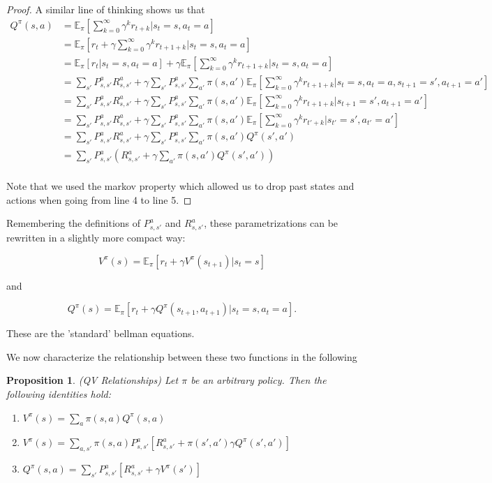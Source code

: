 \documentclass[11pt]{article} %
\newtheorem{prop}{Proposition}
\begin{document}
\begin{proof}
A similar line of thinking shows us that
	\[
		\begin{array}{rl}
			Q^{\pi}(s,a)	& = \mathbb{E}_{\pi}[\sum_{k=0}^{\infty} \gamma^k r_{t+k} | s_t = s, a_t = a]  \\
						& = \mathbb{E}_{\pi}[r_t + \gamma \sum_{k=0}^{\infty} \gamma^k r_{t+1+k} | s_t = s, a_t = a]  \\
						& = \mathbb{E}_{\pi}[r_t | s_t = s, a_t = a] + \gamma \mathbb{E}_{\pi}[ \sum_{k=0}^{\infty} \gamma^k r_{t+1+k} | s_t = s, a_t = a] \\
						& = \sum_{s'} P_{s,s'}^a R_{s,s'}^a + \gamma \sum_{s'} P_{s,s'}^a \sum_{a'} \pi(s,a') \mathbb{E}_{\pi}[\sum_{k=0}^{\infty} \gamma^k r_{t+1+k} | s_t = s, a_t = a, s_{t+1} = s', a_{t+1} = a'] \\
						& = \sum_{s'} P_{s,s'}^a R_{s,s'}^a + \gamma \sum_{s'} P_{s,s'}^a \sum_{a'} \pi(s,a') \mathbb{E}_{\pi}[\sum_{k=0}^{\infty} \gamma^k r_{t+1+k} | s_{t+1} = s', a_{t+1} = a'] \\
						& = \sum_{s'} P_{s,s'}^a R_{s,s'}^a + \gamma \sum_{s'} P_{s,s'}^a \sum_{a'} \pi(s,a') \mathbb{E}_{\pi}[\sum_{k=0}^{\infty} \gamma^k r_{t'+k} | s_{t'} = s', a_{t'} = a'] \\
						& = \sum_{s'} P_{s,s'}^a R_{s,s'}^a + \gamma \sum_{s'} P_{s,s'}^a \sum_{a'} \pi(s,a') Q^{\pi}(s',a') \\
						& = \sum_{s'} P_{s,s'}^a ( R_{s,s'}^a + \gamma \sum_{a'} \pi(s,a') Q^{\pi}(s',a') )  \\
		\end{array}
	\]

Note that we used the markov property which allowed us to drop past states and actions when going from line 4 to line 5.

\end{proof}

Remembering the definitions of $P_{s,s'}^a$ and $R_{s,s'}^a$, these parametrizations can be rewritten in a slightly more compact way:

$$ V^{\pi}(s) =  \mathbb{E}_{\pi}[r_t + \gamma V^{\pi}(s_{t+1}) | s_t = s ] $$

and 

$$ Q^{\pi}(s) = \mathbb{E}_{\pi}[r_t + \gamma Q^{\pi}(s_{t+1},a_{t+1}) | s_t = s, a_t = a]. $$

These are the 'standard' bellman equations.

We now characterize the relationship between these two functions in the following

\begin{prop}{(QV Relationships)}
	Let $\pi$ be an arbitrary policy. Then the following identities hold:
	\begin{enumerate}
		\item $V^{\pi}(s) = \sum_a \pi(s,a) Q^{\pi}(s,a)$ \\
		\item $V^{\pi}(s) = \sum_{a,s'}  \pi(s,a) P_{s,s'}^a [ R_{s,s'}^a + \pi(s',a') \gamma Q^{\pi}(s',a')] $ \\
		\item $Q^{\pi}(s,a) = \sum_{s'} P_{s,s'}^a [ R_{s,s'}^a + \gamma V^{\pi}(s') ] $
	\end{enumerate}
\end{prop}
\end{document}
